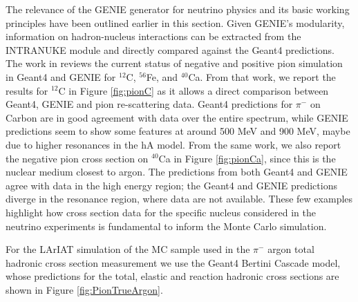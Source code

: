 The relevance of the GENIE generator for neutrino physics and its basic working principles have been outlined earlier in this section. Given GENIE's modularity, information on hadron-nucleus interactions can be extracted from the  INTRANUKE module and directly compared against the Geant4 predictions.
The work in \cite{Nutini2015}  reviews  the current status of negative and positive pion simulation in Geant4 and GENIE for $^{12}$C, $^{56}$Fe, and $^{40}$Ca. From that work, we report the results for $^{12}$C in Figure \ref{fig:pionC} as it allows a direct comparison between Geant4, GENIE and pion re-scattering data.  Geant4 predictions for $\pi^-$  on Carbon are in good agreement with data over  the entire  spectrum, while GENIE predictions seem to show some features at around 500 MeV and 900 MeV, maybe due to higher resonances in the hA model. From the same work, we also report the negative pion cross section on $^{40}$Ca in Figure \ref{fig:pionCa}, since this is the nuclear medium closest to argon. The predictions from both Geant4 and GENIE agree with data in the high energy region; the Geant4 and GENIE predictions diverge in the resonance region, where data are not available. These few examples highlight how cross section data for the specific nucleus considered in the neutrino experiments is fundamental to inform the Monte Carlo simulation.

For the LArIAT simulation of the MC sample used in the $\pi^-$ argon total hadronic cross section measurement we use the Geant4 Bertini Cascade model, whose  predictions for the total, elastic and reaction hadronic cross sections are shown in Figure \ref{fig:PionTrueArgon}.



